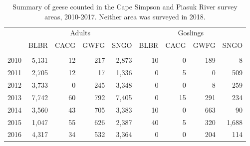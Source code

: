 \documentclass[]{article}
\begin{document}
\begin{table}

\caption{\label{tab:Kable_Table3_output}Summary of geese counted in the Cape Simpson and Piasuk River survey areas, 2010-2017. Neither area was surveyed in 2018.}
\centering
\begin{tabular}[t]{lrrrrrrrr}
\toprule
\multicolumn{1}{c}{} & \multicolumn{4}{c}{Adults} & \multicolumn{4}{c}{Goslings} \\
\cmidrule(l{2pt}r{2pt}){2-5} \cmidrule(l{2pt}r{2pt}){6-9}
 & BLBR & CACG & GWFG & SNGO & BLBR & CACG & GWFG & SNGO\\
\midrule
\addlinespace[0.3em]
\multicolumn{9}{l}{\textbf{Piasuk River}}\\
\hspace{1em}\hspace{1em}\hspace{1em}\hspace{1em}2010 & 5,131 & 12 & 217 & 2,873 & 10 & 0 & 189 & 8\\
\hspace{1em}\hspace{1em}\hspace{1em}\hspace{1em}2011 & 2,705 & 12 & 17 & 1,336 & 0 & 5 & 0 & 509\\
\hspace{1em}\hspace{1em}\hspace{1em}\hspace{1em}2012 & 3,733 & 0 & 245 & 3,348 & 0 & 0 & 8 & 259\\
\hspace{1em}\hspace{1em}\hspace{1em}\hspace{1em}2013 & 7,742 & 60 & 792 & 7,405 & 0 & 15 & 291 & 234\\
\hspace{1em}\hspace{1em}\hspace{1em}\hspace{1em}2014 & 3,560 & 43 & 705 & 3,383 & 10 & 0 & 663 & 90\\
\hspace{1em}\hspace{1em}\hspace{1em}\hspace{1em}2015 & 1,047 & 55 & 626 & 2,387 & 40 & 5 & 320 & 1,688\\
\hspace{1em}\hspace{1em}\hspace{1em}\hspace{1em}2016 & 4,317 & 34 & 532 & 3,364 & 0 & 0 & 204 & 114\\

\end{tabular}
\end{table}
\end{document}
